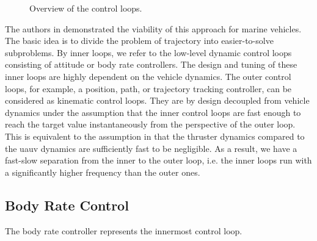 \begin{figure}[tb]
	\caption{Overview of the control loops.} %
	\label{fig:inner-outer-loop-feedback-control}
\end{figure}
The authors in \cite{Maurya09} demonstrated the viability of this approach for marine vehicles. The basic idea is to divide the problem of trajectory into easier-to-solve subproblems. By inner loops, we refer to the low-level dynamic control loops consisting of attitude or body rate controllers. The design and tuning of these inner loops are highly dependent on the vehicle dynamics. The outer control loops, for example, a position, path, or trajectory tracking controller, can be considered as kinematic control loops. They are by design decoupled from vehicle dynamics under the assumption that the inner control loops are fast enough to reach the target value instantaneously from the perspective of the outer loop. This is equivalent to the assumption in  that the thruster dynamics compared to the \ac{uauv} dynamics are sufficiently fast to be negligible. As a result, we have a fast-slow separation from the inner to the outer loop, i.e. the inner loops run with a significantly higher frequency than the outer ones.


\subsection{Body Rate Control}
The body rate controller represents the innermost control loop.

